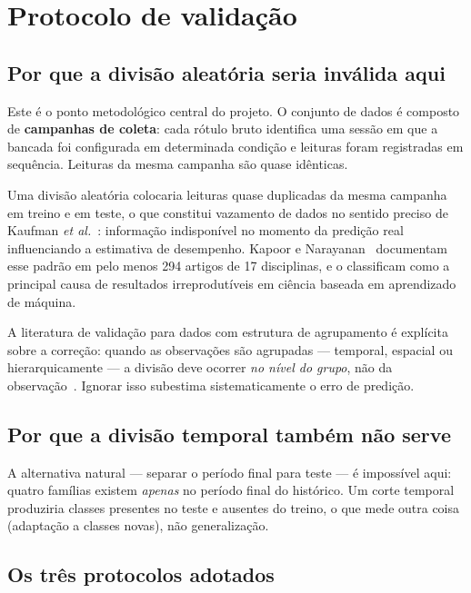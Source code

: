 \section{Protocolo de validação}
\label{sec:validacao}

\subsection{Por que a divisão aleatória seria inválida aqui}

Este é o ponto metodológico central do projeto. O conjunto de dados é composto
de \textbf{campanhas de coleta}: cada rótulo bruto identifica uma sessão em que
a bancada foi configurada em determinada condição e leituras foram registradas
em sequência. Leituras da mesma campanha são quase idênticas.

Uma divisão aleatória colocaria leituras quase duplicadas da mesma campanha em
treino e em teste, o que constitui vazamento de dados no sentido preciso de
Kaufman \textit{et al.}~\cite{kaufman2012leakage}: informação indisponível no
momento da predição real influenciando a estimativa de desempenho. Kapoor e
Narayanan~\cite{kapoor2023leakage} documentam esse padrão em pelo menos 294
artigos de 17 disciplinas, e o classificam como a principal causa de resultados
irreprodutíveis em ciência baseada em aprendizado de máquina.

A literatura de validação para dados com estrutura de agrupamento é explícita
sobre a correção: quando as observações são agrupadas --- temporal, espacial ou
hierarquicamente --- a divisão deve ocorrer \emph{no nível do grupo}, não da
observação~\cite{roberts2017crossvalidation}. Ignorar isso subestima
sistematicamente o erro de predição.

\subsection{Por que a divisão temporal também não serve}

A alternativa natural --- separar o período final para teste --- é impossível
aqui: quatro famílias existem \emph{apenas} no período final do histórico. Um
corte temporal produziria classes presentes no teste e ausentes do treino, o que
mede outra coisa (adaptação a classes novas), não generalização.

\subsection{Os três protocolos adotados}

